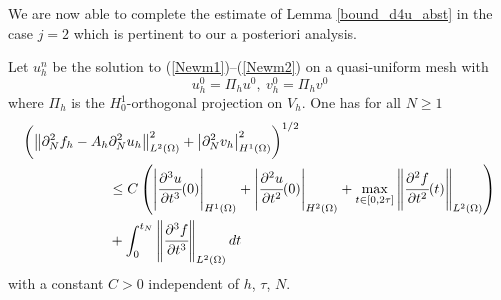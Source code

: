 \documentclass{imanum}
\begin{document}
We are now able to complete the estimate of Lemma \ref{bound_d4u_abst} in the case $j=2$ which is pertinent to our a posteriori analysis.

\begin{lemma}\label{bound_d4u} Let $u_h^n$ be the solution to (\ref{Newm1})--(\ref{Newm2}) on a quasi-uniform mesh with
\begin{equation}
u^0_h = \Pi_h u^0,~v^0_h = \Pi_h v^0 \label{initialcond}
\end{equation}
where $\Pi_h$ is the $H^1_0$-orthogonal projection on $V_h$.
 One has for all $N\ge 1$
\begin{align}
\label{boundj4} \biggl(\bigl\| \partial^{2}_Nf_h-A_h&\partial^{2}_N u_h \bigr\|_{L^2(\Omega)}^2  + \left| {\partial}^2_{N} v_h \right|_{H^1(\Omega)}^2\biggr)^{{1}/{2}}\\
\notag &\leq C \left(\left| \cfrac{\partial^{3}u}{\partial t^{3}}(0) \right|_{H^1(\Omega) }  + \left| \cfrac{\partial^{2}u}{\partial t^{2}}(0) \right|_{H^2(\Omega)} + \max_{t \in [0,2\tau]} \left\| \cfrac{\partial^{2}f}{\partial t^{2}}(t)\right\|_{L^2(\Omega)}
  \right)\\
\notag&+ \int_0^{t_N} \left\| \cfrac{\partial^{3}f}{\partial t^{3}}\right\|_{L^{2}(\Omega)}dt 
\end{align}
with a constant $C > 0$ independent of $h$, $\tau$, $N$.
\end{lemma}
\end{document}
